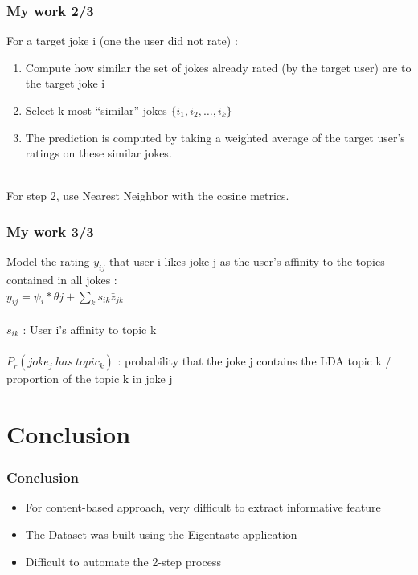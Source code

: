 \documentclass[10pt,handout,english]{beamer}
\begin{document}
			\begin{frame}
			\frametitle{My work 2/3}
				For a target joke i (one the user did not rate) :
				\begin{enumerate}
					\item Compute how similar the set of jokes already rated (by the target user) are to the target joke i
					\item Select k most ``similar'' jokes $\{i_1, i_2, \ldots, i_k\}$
					\item The prediction is computed by taking a weighted average of the target user's ratings on these similar jokes.\\~\\
				\end{enumerate}

				For step 2, use Nearest Neighbor with the cosine metrics.

			\end{frame}


			\begin{frame}
			\frametitle{My work 3/3}
				Model the rating $y_{ij}$ that user i likes joke j as the user's affinity to the topics contained in all jokes :\\
				$y_{ij} = \psi_{i} * \theta{j} + \sum_{k} s_{ik}\bar{z}_{jk}$\\~\\
				$s_{ik}$ : User i's affinity to topic k\\~\\
				$P_r(joke_j~has~topic_k)$ : probability that the joke j contains the LDA topic k / proportion of the topic k in joke j

			\end{frame}

	\section{Conclusion}
		\begin{frame}
		\frametitle{Conclusion}
			\begin{itemize}
				\item For content-based approach, very difficult to extract informative feature
				\item The Dataset was built using the Eigentaste application
				\item Difficult to automate the 2-step process
			\end{itemize}

		\end{frame}


	\appendix
	\setcounter{finalframe}{\value{framenumber}}
	\setcounter{framenumber}{\value{finalframe}}
\end{document}
